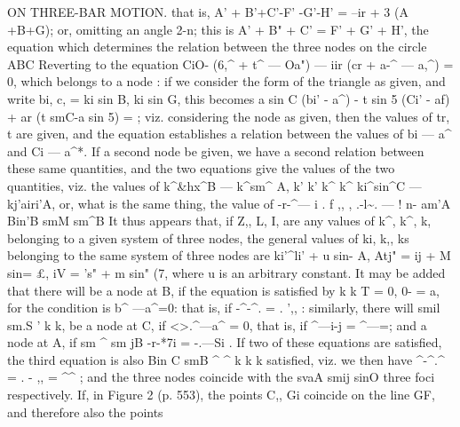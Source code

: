 \documentclass[12pt,a4paper]{article}
\begin{document}
ON THREE-BAR MOTION.
that
is, A' + B'+C'-F' -G'-H' = --ir + 3 (A +B+G);
or, omitting
an
angle
2-n;
this
is A' + B" + C' = F' + G' + H',
the
equation
which
determines
the
relation
between
the
three
nodes
on
the
circle ABC
Reverting
to
the
equation
CiO- (6,\textasciicircum{} + t\textasciicircum{} --- Oa") --- iir (cr + a-\textasciicircum{} --- a,\textasciicircum{}) = 0,
which
belongs
to
a
node
:
if we
consider
the
form
of
the
triangle
as
given,
and
write
bi,
c, = ki sin B,
ki sin G,
this becomes
a sin C (bi' - a\textasciicircum{}) - t sin 5 (Ci' - af) + ar (t smC-a sin 5) =
;
viz. considering
the
node
as
given, then the
values of
tr, t are
given, and the equation
establishes
a
relation
between
the
values
of
bi --- a\textasciicircum{}
and
Ci --- a\textasciicircum{}*.
If a
second
node
be
given, we
have
a
second
relation
between
these
same
quantities,
and
the
two
equations give
the
values
of
the
two
quantities,
viz.
the
values
of k\textasciicircum{}\&hx\textasciicircum{}B --- k\textasciicircum{}sm\textasciicircum{} A,
k'
k'
k\textasciicircum{}
k\textasciicircum{}
ki\textasciicircum{}sin\textasciicircum{}C --- kj'airi'A, or, what is the same thing, the value of
-r-\textasciicircum{}---
i
.
f ,, ,
.-l\textasciitilde{}. --- \textbullet{}
! n-
\textdegree{}
am'A
Bin'B
smM
sm\textasciicircum{}B
It
thus appears
that,
if
Z,, L,
I, are any values of k\textasciicircum{},
k\textasciicircum{},
k,
belonging
to
a given system
of
three nodes, the
general
values
of
ki,
k,,
ks belonging
to
the
same
system
of
three
nodes are
ki'\textasciicircum{}li' + u sin- A,
Atj" = ij\guillemotright{} + M sin= \pounds{},
iV = 's" + m sin" (7,
where u
is an arbitrary constant.
It may be
added
that
there
will
be
a node
at
B,
if
the
equation
is
satisfied by
k
k\guillemotleft{}
T = 0, 0- = a, for the condition
is b\textasciicircum{} ---a\textasciicircum{}=0: that
is, if -\textasciicircum{}-\textasciicircum{}. =
.
',,
: similarly, there
will
smil
sm.S
\textbullet{}'
k
k,
be
a
node
at
C,
if
<>.\textasciicircum{}---a\textasciicircum{} = 0,
that
is,
if
\textasciicircum{}---i-j =
\textasciicircum{}---=;
and
a
node
at
A,
if
sm \textasciicircum{}
sm jB
-r-*7i = -.---Si
.
If
two
of
these
equations
are
satisfied,
the
third
equation
is
also
Bin C
smB
\textasciicircum{}
\textasciicircum{}
k
k
k
satisfied,
viz. we
then
have
\textasciicircum{}-\textasciicircum{}.\textasciicircum{} =
. - ,, =
\textbullet{}
\textasciicircum{}\textasciicircum{}
;
and
the
three nodes coincide with the
svaA
smij
sinO
three
foci
respectively.
If,
in
Figure
2
(p.
553), the
points
C,, Gi coincide
on
the
line GF, and
therefore
also the points
\end{document}
